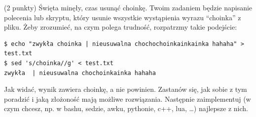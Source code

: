 \begin{zadanie}(2 punkty)
Święta minęły, czas usunąć choinkę. Twoim zadaniem będzie napisanie polecenia lub skryptu, który usunie wszystkie wystąpienia wyrazu ``choinka'' z pliku. Żeby zrozumieć, na czym polega trudność, rozpatrzmy takie podejście:

\begin{verbatim}
$ echo "zwykła choinka | nieusuwalna chochochoinkainkainka hahaha" > test.txt
$ sed 's/choinka//g' < test.txt 
zwykła  | nieusuwalna chochoinkainka hahaha
\end{verbatim}

Jak widać, wynik zawiera choinkę, a nie powinien. Zastanów się, jak sobie z tym poradzić i jaką złożoność mają możliwe rozwiązania. Następnie zaimplementuj (w czym chcesz, np. w bashu, sedzie, awku, pythonie, c++, lua, \dots) najlepsze z nich.
\end{zadanie}




